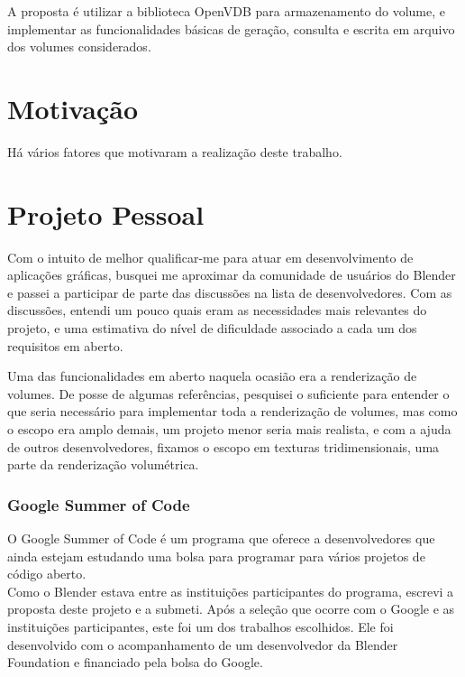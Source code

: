 \documentclass[12pt, a4paper, oneside]{book}
\begin{document}
A proposta é utilizar a biblioteca OpenVDB para armazenamento do volume, e implementar as funcionalidades básicas de geração, consulta e escrita em arquivo dos volumes considerados.

\section{Motivação}
Há vários fatores que motivaram a realização deste trabalho. 
\section{Projeto Pessoal}
Com o intuito de melhor qualificar-me para atuar em desenvolvimento de aplicações gráficas, busquei me aproximar da comunidade de usuários do Blender e passei a participar de parte das discussões na lista de desenvolvedores. Com as discussões, entendi um pouco quais eram as necessidades mais relevantes do projeto, e uma estimativa do nível de dificuldade associado a cada um dos requisitos em aberto. 

Uma das funcionalidades em aberto naquela ocasião era a renderização de volumes. De posse de algumas referências, pesquisei o suficiente para entender o que seria necessário para implementar toda a renderização de volumes, mas como o escopo era amplo demais, um projeto menor seria mais realista, e com a ajuda de outros desenvolvedores, fixamos o escopo em texturas tridimensionais, uma parte da renderização volumétrica. 

\subsubsection{Google Summer of Code}
O Google Summer of Code é um programa que oferece a desenvolvedores que ainda estejam estudando uma bolsa para programar para vários projetos de código aberto. \\

Como o Blender estava entre as instituições participantes do programa, escrevi a proposta deste projeto e a submeti. Após a seleção que ocorre com o Google e as instituições participantes, este foi um dos trabalhos escolhidos. Ele foi desenvolvido com o acompanhamento de um desenvolvedor da Blender Foundation e financiado pela bolsa do Google.

\subsubsection{}
\end{document}
